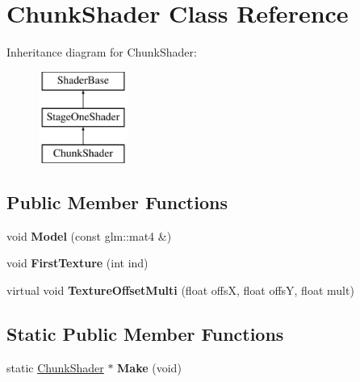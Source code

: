 \hypertarget{classChunkShader}{\section{\-Chunk\-Shader \-Class \-Reference}
\label{classChunkShader}
}
\-Inheritance diagram for \-Chunk\-Shader\-:\begin{figure}[H]
\begin{center}
\leavevmode
\includegraphics[height=3.000000cm]{classChunkShader}
\end{center}
\end{figure}
\subsection*{\-Public \-Member \-Functions}
\begin{DoxyCompactItemize}
\item 
\hypertarget{classChunkShader_ae69371ea31b05cf34ab85357e2ce7588}{void {\bfseries \-Model} (const glm\-::mat4 \&)}\label{classChunkShader_ae69371ea31b05cf34ab85357e2ce7588}

\item 
\hypertarget{classChunkShader_ae12bf7919d207ec1a9a51103f4e0ca58}{void {\bfseries \-First\-Texture} (int ind)}\label{classChunkShader_ae12bf7919d207ec1a9a51103f4e0ca58}

\item 
\hypertarget{classChunkShader_a62334139662241090f92e742f92c5473}{virtual void {\bfseries \-Texture\-Offset\-Multi} (float offs\-X, float offs\-Y, float mult)}\label{classChunkShader_a62334139662241090f92e742f92c5473}

\end{DoxyCompactItemize}
\subsection*{\-Static \-Public \-Member \-Functions}
\begin{DoxyCompactItemize}
\item 
\hypertarget{classChunkShader_a9bfc76370f471b02c61c9435f7ab969c}{static \hyperlink{classChunkShader}{\-Chunk\-Shader} $\ast$ {\bfseries \-Make} (void)}\label{classChunkShader_a9bfc76370f471b02c61c9435f7ab969c}

\end{DoxyCompactItemize}
